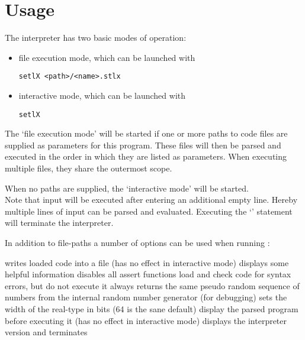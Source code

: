 \newpage

\section{Usage}

The \setlX{} interpreter has two basic modes of operation:

\begin{itemize}
	\item file execution mode, which can be launched with
\begin{lstlisting}[frame=none,numbers=none]
setlX <path>/<name>.stlx
\end{lstlisting}
	\item interactive mode, which can be launched with
\begin{lstlisting}[frame=none,numbers=none]
setlX
\end{lstlisting}
\end{itemize}

The `file execution mode' will be started if one or more paths to code files are supplied as parameters for this program. These files will then be parsed and executed in the order in which they are listed as parameters. When executing multiple files, they share the outermost scope.

When no paths are supplied, the `interactive mode' will be started.\\
Note that input will be executed after entering an additional empty line. Hereby multiple lines of input can be parsed and evaluated. Executing the `' statement will terminate the interpreter.


In addition to file-paths a number of options can be used when running \setlX{}:

\begin{itemize}
	      {writes loaded code into a file (has no effect in interactive mode)}
	      {displays some helpful information}
	      {disables all assert functions}
	      {load and check code for syntax errors, but do not execute it}
	      {always returns the same pseudo random sequence of numbers from the internal random number generator (for debugging)}
           {sets the width of the real-type in bits (64 is the sane default)}
           {display the parsed program before executing it (has no effect in interactive mode)}
           {displays the interpreter version and terminates}
\end{itemize}

